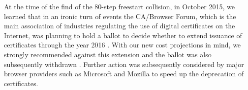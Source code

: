 \medskip

At the time of the find of the 80-step freestart collision, in October 2015, we learned that in an ironic turn of events the CA/Browser Forum, which is the main association of industries regulating the use of digital certificates on the Internet,
was planning to hold a ballot to decide whether to extend issuance of \shaone certificates through the year 2016 \cite{cabforum}.
With our new cost projections in mind, we strongly recommended against this extension and the ballot was also subsequently withdrawn \cite{cabforum2}.
Further action was subsequently considered by major browser providers such as Microsoft \cite{MS_sha} and Mozilla \cite{Moz_sha} to speed up the deprecation of \shaone certificates.
